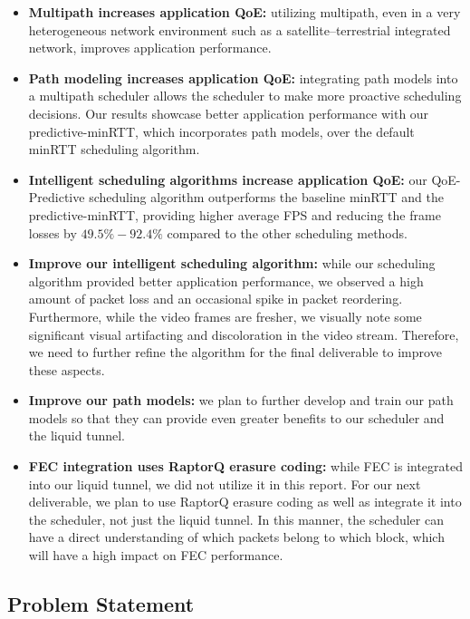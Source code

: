 \documentclass[sigconf,nonacm]{acmart}
\begin{document}
\begin{itemize}
    \item \textbf{Multipath increases application QoE:} utilizing multipath, even in a very heterogeneous network environment such as a satellite--terrestrial integrated network, improves application performance.
    \item \textbf{Path modeling increases application QoE:} integrating path models into a multipath scheduler allows the scheduler to make more proactive scheduling decisions. Our results showcase better application performance with our predictive-minRTT, which incorporates path models, over the default minRTT scheduling algorithm.
    \item \textbf{Intelligent scheduling algorithms increase application QoE:} our QoE-Predictive scheduling algorithm outperforms the baseline minRTT and the predictive-minRTT, providing higher average FPS and reducing the frame losses by $49.5\%-92.4\%$ compared to the other scheduling methods.
    \item \textbf{Improve our intelligent scheduling algorithm:} while our scheduling algorithm provided better application performance, we observed a high amount of packet loss and an occasional spike in packet reordering. Furthermore, while the video frames are fresher, we visually note some significant visual artifacting and discoloration in the video stream. Therefore, we need to further refine the algorithm for the final deliverable to improve these aspects.
    \item \textbf{Improve our path models:} we plan to further develop and train our path models so that they can provide even greater benefits to our scheduler and the liquid tunnel.
    \item \textbf{FEC integration uses RaptorQ erasure coding:} while FEC is integrated into our liquid tunnel, we did not utilize it in this report. For our next deliverable, we plan to use RaptorQ erasure coding as well as integrate it into the scheduler, not just the liquid tunnel. In this manner, the scheduler can have a direct understanding of which packets belong to which block, which will have a high impact on FEC performance.
    
\end{itemize}


\subsection{Problem Statement}
\end{document}
